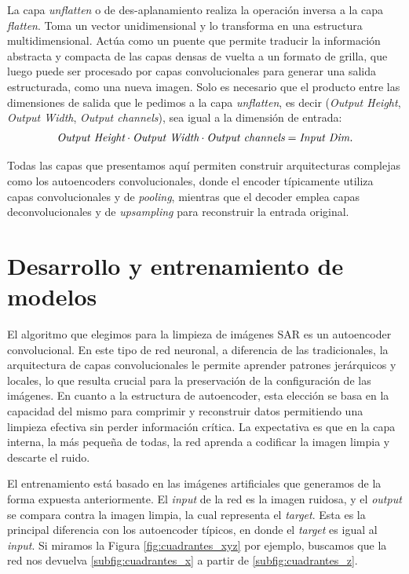 La capa \emph{unflatten} o de des-aplanamiento realiza la operación inversa a la capa \emph{flatten}. Toma un vector unidimensional y lo transforma en una estructura multidimensional. Actúa como un puente que permite traducir la información abstracta y compacta de las capas densas de vuelta a un formato de grilla, que luego puede ser procesado por capas convolucionales para generar una salida estructurada, como una nueva imagen. Solo es necesario que el producto entre las dimensiones de salida que le pedimos a la capa \emph{unflatten}, es decir (\emph{Output Height}, \emph{Output Width}, \emph{Output channels}), sea igual a la dimensión de entrada:
\begin{equation}
    \emph{Output Height} \cdot \emph{Output Width} \cdot \emph{Output channels} = \emph{Input Dim.}
\end{equation}

Todas las capas que presentamos aquí permiten construir arquitecturas complejas como los autoencoders convolucionales, donde el encoder típicamente utiliza capas convolucionales y de \emph{pooling}, mientras que el decoder emplea capas deconvolucionales y de \emph{upsampling} para reconstruir la entrada original.

\section{Desarrollo y entrenamiento de modelos}

El algoritmo que elegimos para la limpieza de imágenes SAR es un autoencoder convolucional. En este tipo de red neuronal, a diferencia de las tradicionales, la arquitectura de capas convolucionales le permite aprender patrones jerárquicos y locales, lo que resulta crucial para la preservación de la configuración de las imágenes. En cuanto a la estructura de autoencoder, esta elección se basa en la capacidad del mismo para comprimir y reconstruir datos permitiendo una limpieza efectiva sin perder información crítica. La expectativa es que en la capa interna, la más pequeña de todas, la red aprenda a codificar la imagen limpia y descarte el ruido.

El entrenamiento está basado en las imágenes artificiales que generamos de la forma expuesta anteriormente. El \emph{input} de la red es la imagen ruidosa, y el \emph{output} se compara contra la imagen limpia, la cual representa el \emph{target}. Esta es la principal diferencia con los autoencoder típicos, en donde el \emph{target} es igual al \emph{input}. Si miramos la Figura \ref{fig:cuadrantes_xyz} por ejemplo, buscamos que la red nos devuelva \ref{subfig:cuadrantes_x} a partir de \ref{subfig:cuadrantes_z}.

